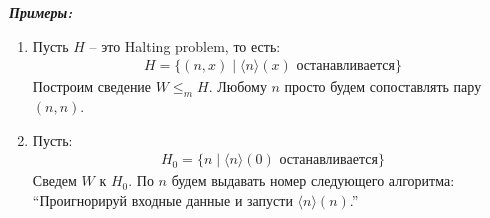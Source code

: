 \textit{\textbf{Примеры:}}

\begin{enumerate}
    \item Пусть $H$ -- это Halting problem, то есть:
    \begin{gather*}
        H = \{ (n, x) \mid \langle n \rangle (x) \text{ останавливается} \}
    \end{gather*}
    Построим сведение $W \leqslant_m H$. Любому $n$ просто будем сопоставлять пару $(n, n)$. 
    \item Пусть:
    \begin{gather*}
        H_0 = \{ n \mid \langle n \rangle (0) \text{ останавливается} \}
    \end{gather*}
    Сведем $W$ к $H_0$. По $n$ будем выдавать номер следующего алгоритма: ``Проигнорируй входные данные и запусти $\langle n \rangle (n)$.''
\end{enumerate}